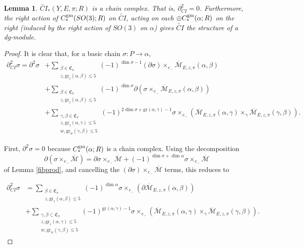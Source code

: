 \documentclass{memo-l}
\newtheorem{lemma}[theorem]{Lemma}
\theoremstyle{definition}
\theoremstyle{remark}
\numberwithin{section}{chapter}
\numberwithin{equation}{chapter}
\begin{document}
\begin{lemma}\label{complex}$\widetilde{CI}_*(Y,E,\pi;R)$ is a chain complex. That is, $\partial_{CI}^2 = 0$. Furthermore, the right action of $C_*^{\textup{gm}}(SO(3);R)$ on $\widetilde{CI}$, acting on each $\oplus C_*^{\textup{gm}}(\alpha;R)$ on the right (induced by the right action of $SO(3)$ on $\alpha$) gives $\widetilde{CI}$ the structure of a dg-module.
\end{lemma}

\begin{proof}It is clear that, for a basic chain $\sigma: P \to \alpha$,
\begin{align*}\partial_{CI}^2 \sigma = \partial^2 \sigma &+ \sum_{\substack{\beta \in \mathfrak C_\pi\\z, \text{gr}_z(\alpha, \beta) \leq 5}} (-1)^{\dim \sigma - 1} (\partial \sigma) \times_{e_-} \overline{\mathcal M}_{E,z,\pi}(\alpha, \beta) \\
&+ \sum_{\substack{\beta \in \mathfrak C_\pi\\z, \text{gr}_z(\alpha, \beta) \leq 5}} (-1)^{\dim \sigma} \partial\left(\sigma \times_{e_-} \overline{\mathcal M}_{E,z,\pi}(\alpha, \beta)\right)\\
&+ \sum_{\substack{\gamma, \beta \in \mathfrak C_\pi\\z, \text{gr}_z(\alpha, \gamma) \leq 5\\ w, \text{gr}_w(\gamma,\beta) \leq 5}}(-1)^{2\dim \sigma + \text{gr}(\alpha, \gamma)-1}\sigma \times_{e_-} \left(\overline{\mathcal M}_{E,z,\pi}(\alpha, \gamma) \times_{\gamma} \overline{\mathcal M}_{E,z,\pi}(\gamma, \beta)\right).\end{align*} 

First, $\partial^2 \sigma = 0$ because $C_*^{\textup{gm}}(\alpha;R)$ is a chain complex. Using the decomposition $$\partial(\sigma \times_{e_-} \overline{\mathcal M})= \partial \sigma \times_{e_-} \overline{\mathcal M} + (-1)^{\dim \sigma + \dim \alpha} \sigma \times_{e_-} \overline{\mathcal M}$$ of Lemma \ref{fibprod}, and cancelling the $(\partial \sigma) \times_{e_-} \overline{\mathcal M}$ terms, this reduces to

\begin{align*}\partial_{CI}^2 \sigma &= \sum_{\substack{\beta \in \mathfrak C_\pi\\z, \text{gr}_z(\alpha, \beta) \leq 5}} (-1)^{\dim \alpha}\sigma \times_{e_-} \left(\partial \overline{\mathcal M}_{E,z,\pi}(\alpha, \beta)\right) \\ 
&+ \sum_{\substack{\gamma, \beta \subset \mathfrak C_\pi\\z, \text{gr}_z(\alpha, \gamma) \leq 5\\ w, \text{gr}_w(\gamma,\beta) \leq 5}} (-1)^{\text{gr}(\alpha, \gamma) - 1} \sigma \times_{e_-} \left(\overline{\mathcal M}_{E,z,\pi}(\alpha, \gamma) \times_{\gamma} \overline{\mathcal M}_{E,z,\pi}(\gamma, \beta)\right).\end{align*} 


\end{proof}
\end{document}
